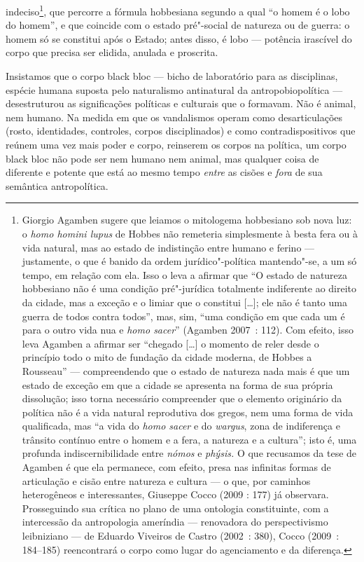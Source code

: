 indeciso\footnote{Giorgio Agamben sugere que leiamos o
  mitologema hobbesiano sob nova luz: o \emph{homo homini lupus} de
  Hobbes não remeteria simplesmente à besta fera ou à vida natural, mas
  ao estado de indistinção entre humano e ferino --- justamente, o que é
  banido da ordem jurídico"-política mantendo"-se, a um só tempo, em
  relação com ela. Isso o leva a afirmar que ``O estado de natureza
  hobbesiano não é uma condição pré"-jurídica totalmente indiferente ao
  direito da cidade, mas a exceção e o limiar que o constitui {[}\ldots{}{]};
  ele não é tanto uma guerra de todos contra todos'', mas, sim, ``uma
  condição em que cada um é para o outro vida nua e \emph{homo sacer}''
  (Agamben 2007~: 112). Com efeito, isso leva Agamben a
  afirmar ser ``chegado {[}\ldots{}{]} o momento de reler desde o princípio
  todo o mito de fundação da cidade moderna, de Hobbes a Rousseau'' ---
  compreendendo que o estado de natureza nada mais é que um estado de
  exceção em que a cidade se apresenta na forma de sua própria
  dissolução; isso torna necessário compreender que o elemento
  originário da política não é a vida natural reprodutiva dos gregos,
  nem uma forma de vida qualificada, mas ``a vida do \emph{homo sacer} e
  do \emph{wargus}, zona de indiferença e trânsito contínuo entre o
  homem e a fera, a natureza e a cultura''; isto é, uma profunda
  indiscernibilidade entre \emph{nómos} e \emph{phýsis.} O que recusamos
  da tese de Agamben é que ela permanece, com efeito, presa nas
  infinitas formas de articulação e cisão entre natureza e cultura --- o
  que, por caminhos heterogêneos e interessantes, Giuseppe Cocco (2009 :
  177) já observara. Prosseguindo sua crítica no plano de uma ontologia
  constituinte, com a intercessão da antropologia ameríndia ---
  renovadora do perspectivismo leibniziano --- de Eduardo Viveiros de
  Castro (2002~: 380), Cocco (2009~: 184--185) reencontrará o corpo como
  lugar do agenciamento e da diferença.}, que percorre a fórmula
hobbesiana segundo a qual ``o homem é o lobo do homem'', e que coincide
com o estado pré"-social de natureza ou de guerra: o homem só se
constitui após o Estado; antes disso, é lobo --- potência irascível do
corpo que precisa ser elidida, anulada e proscrita.

Insistamos que o corpo black bloc --- bicho de laboratório para as
disciplinas, espécie humana suposta pelo naturalismo antinatural da
antropobiopolítica --- desestruturou as significações políticas e
culturais que o formavam. Não é animal, nem humano. Na medida em que os
vandalismos operam como desarticulações (rosto, identidades, controles,
corpos disciplinados) e como contradispositivos que reúnem uma vez mais
poder e corpo, reinserem os corpos na política, um corpo black bloc não
pode ser nem humano nem animal, mas qualquer coisa de diferente e
potente que está ao mesmo tempo \emph{entre }as cisões e
\emph{fora }de sua semântica antropolítica.

